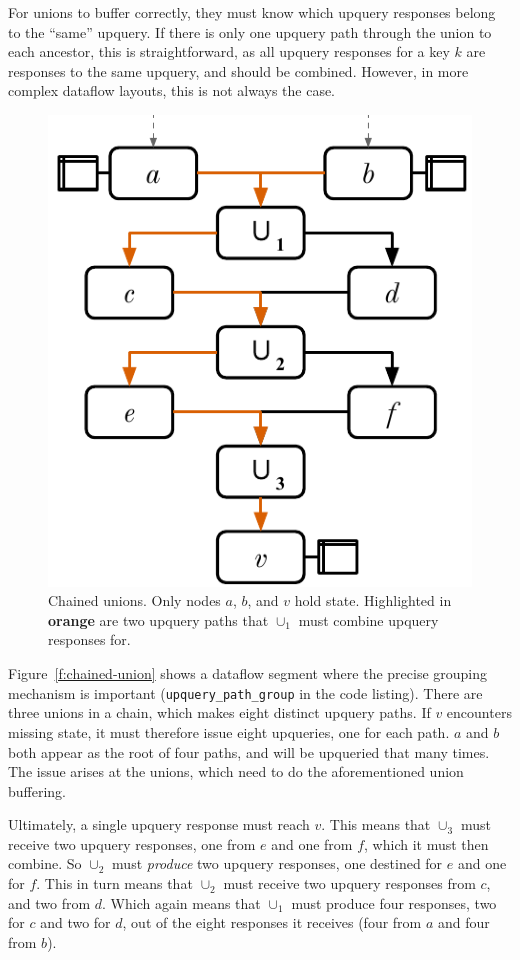 For unions to buffer correctly, they must know which upquery responses belong to
the ``same'' upquery. If there is only one upquery path through the union to
each ancestor, this is straightforward, as all upquery responses for a key $k$
are responses to the same upquery, and should be combined. However, in more
complex dataflow layouts, this is not always the case.

\begin{figure}[t]
  \centering
  \includegraphics{diagrams/Chained Unions.pdf}
  \caption{Chained unions. Only nodes $a$, $b$, and $v$ hold state. Highlighted
  in \textbf{\color{brewerorange}orange} are two upquery paths that $\cup_1$
  must combine upquery responses for.}
  \label{f:chained-union}
\end{figure}

Figure~\vref{f:chained-union} shows a dataflow segment where the precise grouping
mechanism is important (\texttt{upquery\_path\_group} in the code listing).
There are three unions in a chain, which makes eight distinct upquery paths. If
$v$ encounters missing state, it must therefore issue eight upqueries, one for
each path. $a$ and $b$ both appear as the root of four paths, and will be
upqueried that many times. The issue arises at the unions, which need to do
the aforementioned union buffering.

Ultimately, a single upquery response must reach $v$. This means that $\cup_3$
must receive two upquery responses, one from $e$ and one from $f$, which it must
then combine. So $\cup_2$ must \emph{produce} two upquery responses, one
destined for $e$ and one for $f$. This in turn means that $\cup_2$ must receive
two upquery responses from $c$, and two from $d$. Which again means that
$\cup_1$ must produce four responses, two for $c$ and two for $d$, out of the
eight responses it receives (four from $a$ and four from $b$).

